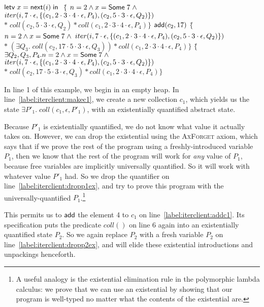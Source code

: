 \begin{specification}
 $\mathsf{letv}\;x = \mathsf{next}(i)\;\mathsf{in}\;$  \nextline
 $\{$\= $n = 2 \land x = \mathsf{Some\; }7 \;\land $ 
 \> $iter(i, 7\cdot\epsilon, \{{(c_1, 2\cdot3\cdot4\cdot\epsilon, P_4), (c_2, 5\cdot3\cdot\epsilon, Q_2)}\})$  \nextline
 \> $*\; coll(c_2, 5\cdot3\cdot\epsilon, Q_2) * coll(c_1, 2\cdot3\cdot4\cdot\epsilon, P_4)\}$  
 $\mathsf{add}(c_2, 17)$  \nextline
 $\{$\= $n = 2 \land x = \mathsf{Some\; }7 \;\land $ \nextline
 \> $iter(i, 7\cdot\epsilon, \{{(c_1, 2\cdot3\cdot4\cdot\epsilon, P_4), (c_2, 5\cdot3\cdot\epsilon, Q_2)}\})$  
 \> $* \; (\exists Q_3.\; coll(c_2, 17\cdot5\cdot3\cdot\epsilon, Q_3)) * coll(c_1, 2\cdot3\cdot4\cdot\epsilon, P_4)\}$  \nextline
 $\{$\= $\exists Q_2, Q_3, P_4. n = 2 \land x = \mathsf{Some\; }7 \;\land $ \nextline
 \> $iter(i, 7\cdot\epsilon, \{{(c_1, 2\cdot3\cdot4\cdot\epsilon, P_4), (c_2, 5\cdot3\cdot\epsilon, Q_2)}\})$  \nextline 
 \> $* \; coll(c_2, 17\cdot5\cdot3\cdot\epsilon, Q_3) * coll(c_1, 2\cdot3\cdot4\cdot\epsilon, P_4)\}$  
\end{specification}


In line 1 of this example, we begin in an empty heap. In
line~\ref{label:iterclient:makec1}, we create a new collection $c_1$,
which yields us the state $\exists P'_1.\; coll(c_1, \epsilon, P'_1)$,
with an existentially quantified abstract state.

Because $P'_1$ is existentially quantified, we do not know what value
it actually takes on. However, we can drop the existential using the
\textsc{AxForget} axiom, which says that if we prove the rest of the
program using a freshly-introduced variable $P_1$, then we know that
the rest of the program will work for \emph{any} value of $P_1$,
because free variables are implicitly universally quantified.  So it
will work with whatever value $P'_1$ had. So we drop the quantifier on
line~\ref{label:iterclient:dropp1ex}, and try to prove this program
with the universally-quantified $P_1$.\footnote{A useful analogy is
  the existential elimination rule in the polymorphic lambda calculus:
  we prove that we can use an existential by showing that our program
  is well-typed no matter what the contents of the existential are.}

This permits us to $\mathsf{add}$ the element 4 to $c_1$ on
line~\ref{label:iterclient:addc1}. Its specification puts the
predicate $coll()$ on line 6 again into an existentially quantified
state $P_2$. So we again replace $P_2$ with a fresh variable $P_2$ on
line~\ref{label:iterclient:dropp2ex}, and will elide these existential introductions and unpackings
henceforth.

